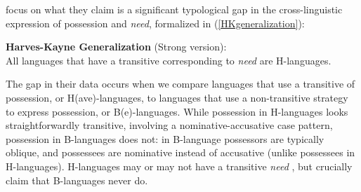 \documentclass[output=paper,
modfonts
]{langscibook}
\begin{document}
\citet{Harves:2012} focus on what they claim is a significant typological gap in the cross-linguistic expression of possession and {\it need}, formalized in (\ref{HKgeneralization}):


\begin{exe} 
\ex\label{HKgeneralization} \textbf{Harves-Kayne Generalization} (Strong version): \hfill \citep[1]{Harves:2012}\\
All languages that have a transitive  corresponding to {\it need} are H-languages.\hspace{1.75in}
\end{exe}

The gap in their data occurs when we compare languages that use a transitive  of possession, or H(ave)-languages, to languages that use a non-transitive strategy to express possession, or B(e)-languages.    While possession in H-languages looks straightforwardly
transitive, involving a nominative-accusative case pattern, possession
in B-languages  does not: in B-language possessors are typically
oblique, and possessees are nominative instead of accusative (unlike
possessees in H-languages).  H-languages may or may
not  have a transitive {\it need} ,  but \citet{Harves:2012} crucially claim that B-languages
never do.%
\end{document}
